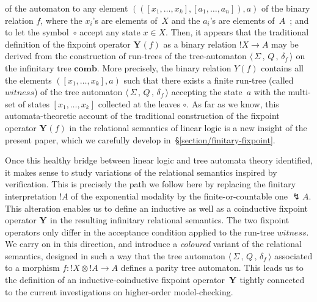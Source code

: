 \documentclass[runningheads,a4paper]{llncs}
\newcommand{\superbang}{\lightning} \newcommand{\modality}{\Box}
\newcommand{\tensor}{\otimes}
\newcommand{\tree}{\textit{witness}}
\newcommand{\fixpoint}[1]{\textbf{Y}_{#1}}
\begin{document}
\noindent
of the automaton to any element $(([x_1,\dots,x_k],[a_1,\dots, a_n]),a)$ of the binary relation $f$,
where the $x_i$'s are elements of~$X$ and the $a_i$'s are elements of~$A$~;
and to let the symbol~$\circ$ accept any state $x\in X$.
Then, it appears that the traditional definition of the fixpoint operator $\fixpoint{}(f)$ as a binary relation $!X\to A$
may be derived from the construction of run-trees of the tree-automaton $\langle \, \Sigma \, , \, Q \, , \, \delta_f \, \rangle$
on the infinitary tree $\textbf{comb}$.
More precisely, the binary relation $Y(f)$ contains all the elements $([x_1,\dots,x_k],a)$
such that there exists a finite run-tree (called $\tree$) of the tree automaton $\langle \, \Sigma \, , \, Q \, , \, \delta_f \, \rangle$
accepting the state~$a$ with the multi-set of states $[x_1,\dots,x_k]$ collected at the leaves $\circ$.
As far as we know, this automata-theoretic account of the traditional construction of the fixpoint operator $\fixpoint{}(f)$ 
in the relational semantics of linear logic is a new insight of the present paper, which we carefully develop in~\S\ref{section/finitary-fixpoint}.


\medbreak

Once this healthy bridge between linear logic and tree automata theory identified,
it makes sense to study variations of the relational semantics inspired by verification.
This is precisely the path we follow here by replacing the finitary interpretation $!A$
of the exponential modality by the finite-or-countable one $\superbang A$.
This alteration enables us to define an inductive as well as a coinductive fixpoint operator $\fixpoint{}$
in the resulting infinitary relational semantics.
The two fixpoint operators only differ in the acceptance condition applied to the run-tree $\tree$.
We carry on in this direction, and introduce a \emph{coloured} variant of the relational semantics,
designed in such a way that the tree automaton $\langle \, \Sigma \, , \, Q \, , \, \delta_f \, \rangle$
associated to a morphism $f: {!X}\tensor{!A}\to A$ defines a parity tree automaton.
This leads us to the definition of an inductive-coinductive fixpoint operator~$\fixpoint{}$
tightly connected to the current investigations on higher-order model-checking.
\end{document}
